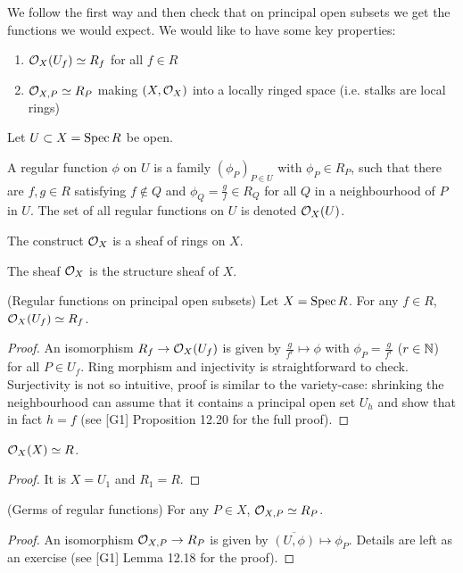\documentclass[a4paper,11pt]{article}
\begin{document}
			\noindent We follow the first way and then check that on principal open subsets we get the functions we would expect.
			We would like to have some key properties:
			\begin{enumerate}
				\item $\mathcal{O}_X(U_f)\simeq R_f$ for all $f\in R$
				\item $\mathcal{O}_{X,P}\simeq R_P$ making $(X,\mathcal{O}_X)$ into a locally ringed space (i.e. stalks are local rings)
			\end{enumerate}

			\noindent Let $U\subset X=\operatorname{Spec} R$ be open.

			\begin{defi}
				A regular function $\phi$ on $U$ is a family $(\phi_P)_{P\in U}$ with $\phi_P\in R_P$, such that there are $f,g\in R$ satisfying $f\notin Q$ and $\phi_Q=\frac{g}{f}\in R_Q$ for all $Q$ in a neighbourhood of $P$ in $U$. The set of all regular functions on $U$ is denoted $\mathcal{O}_X(U)$.
			\end{defi}

			\begin{prop}
				The construct $\mathcal{O}_X$ is a sheaf of rings on $X$.
			\end{prop}

			The sheaf $\mathcal{O}_X$ is the structure sheaf of $X$.

			\begin{prop}\label{prop--principal}(Regular functions on principal open subsets)
				Let $X=\operatorname{Spec} R$. For any $f\in R$, $\mathcal{O}_X(U_f)\simeq R_f$.
			\end{prop}
			\begin{proof}
				An isomorphism $R_f\rightarrow \mathcal{O}_X(U_f)$ is given by $\frac{g}{f^r}\mapsto\phi$ with $\phi_P=\frac{g}{f^r}$ ($r\in\mathbb{N}$) for all $P\in U_f$. Ring morphism and injectivity is straightforward to check. Surjectivity is not so intuitive, proof is similar to the variety-case: shrinking the neighbourhood can assume that it contains a principal open set $U_h$ and show that in fact $h=f$ (see [G1] Proposition 12.20 for the full proof).
			\end{proof}

			\begin{cor}
				$\mathcal{O}_X(X)\simeq R$.
			\end{cor}
			\begin{proof}
				It is $X=U_1$ and $R_1=R$.
			\end{proof}

			\begin{prop}\label{prop--germs}(Germs of regular functions)
				For any $P\in X$, $\mathcal{O}_{X,P}\simeq R_P$.
			\end{prop}
			\begin{proof}
				An isomorphism $\mathcal{O}_{X,P}\rightarrow R_P$ is given by $\overline{(U,\phi)}\mapsto\phi_P$. Details are left as an exercise (see [G1] Lemma 12.18 for the proof).
			\end{proof}
\end{document}
